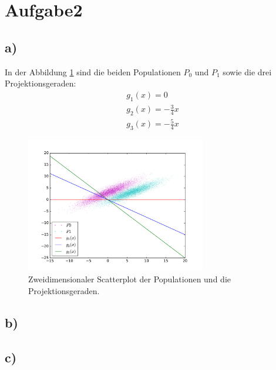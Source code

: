 \newpage
\section{Aufgabe2}
\label{sec:a2}

\subsection{a)}
\label{subsec:a2a}
In der Abbildung \ref{fig:scatter} sind die beiden Populationen
$P_0$ und $P_1$ sowie die drei Projektionsgeraden:
\begin{align}
  g_1(x)=0\\
  g_2(x)=-\frac34x\\
  g_3(x)=-\frac54x
\end{align}
\begin{figure}
  \centering
  \includegraphics[width=0.7\textwidth]{scatterplot2D.pdf}
  \caption{Zweidimensionaler Scatterplot der Populationen und die
  Projektionsgeraden.}
  \label{fig:scatter}
\end{figure}
\subsection{b)}
\label{subsec:a2b}

\subsection{c)}
\label{subsec:a2c}
